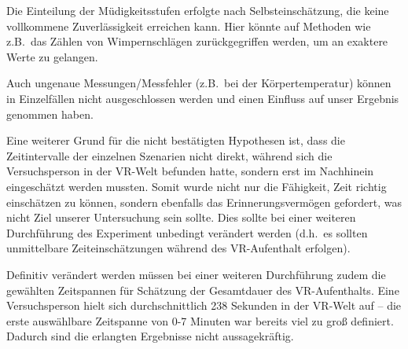 \documentclass{Paper}
\begin{document}
Die Einteilung der Müdigkeitsstufen erfolgte nach Selbsteinschätzung, die keine vollkommene Zuverlässigkeit erreichen kann. Hier könnte auf Methoden wie z.B.\ das Zählen von Wimpernschlägen zurückgegriffen werden, um an exaktere Werte zu gelangen.

Auch ungenaue Messungen/Messfehler (z.B.\ bei der Körpertemperatur) können in Einzelfällen nicht ausgeschlossen werden und einen Einfluss auf unser Ergebnis genommen haben.

Eine weiterer Grund für die nicht bestätigten Hypothesen ist, dass die Zeitintervalle der einzelnen Szenarien nicht direkt, während sich die Versuchsperson in der VR-Welt befunden hatte, sondern erst im Nachhinein eingeschätzt werden mussten.
Somit wurde nicht nur die Fähigkeit, Zeit richtig einschätzen zu können, sondern
ebenfalls das Erinnerungsvermögen gefordert, was nicht Ziel unserer Untersuchung sein sollte. Dies sollte bei einer weiteren Durchführung des Experiment unbedingt verändert werden (d.h.\ es sollten unmittelbare Zeiteinschätzungen während des VR-Aufenthalt erfolgen).

Definitiv verändert werden müssen bei einer weiteren Durchführung zudem die gewählten Zeitspannen für Schätzung der Gesamtdauer des VR-Aufenthalts. Eine Versuchsperson hielt sich durchschnittlich 238 Sekunden in der VR-Welt auf -- die erste auswählbare Zeitspanne von 0-7 Minuten war bereits viel zu groß definiert. Dadurch sind die erlangten Ergebnisse nicht aussagekräftig.


\newpage

\printbibliography
\end{document}
